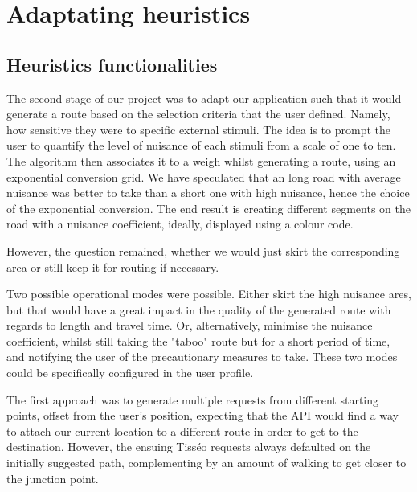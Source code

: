 \section{Adaptating heuristics}
\subsection{Heuristics functionalities}

The second stage of our project was to adapt our application such that it would generate a route based on the selection criteria that the user defined. Namely, how sensitive they were to specific external stimuli. The idea is to prompt the user to quantify the level of nuisance of each stimuli from a scale of one to ten. The algorithm then associates it to a weigh whilst generating a route, using an exponential conversion grid. We have speculated that an long road with average nuisance was better to take than a short one with high nuisance, hence the choice of the exponential conversion. The end result is creating different segments on the road with a nuisance coefficient, ideally, displayed using a colour code. 
\newline

However, the question remained, whether we would just skirt the corresponding area or still keep it for routing if necessary.
\newline

Two possible operational modes were possible. Either skirt the high nuisance ares, but that would have a great impact in the quality of the generated route with regards to length and travel time. Or, alternatively, minimise the nuisance coefficient, whilst still taking the "taboo" route but for a short period of time, and notifying the user of the precautionary measures to take. These two modes could be specifically configured in the user profile. 
\newline

The first approach was to generate multiple requests from different starting points, offset from the user's position, expecting that the API would find a way to attach our current location to a different route in order to get to the destination. However, the ensuing Tisséo requests always defaulted on the initially suggested path, complementing by an amount of walking to get closer to the junction point.
\newline

